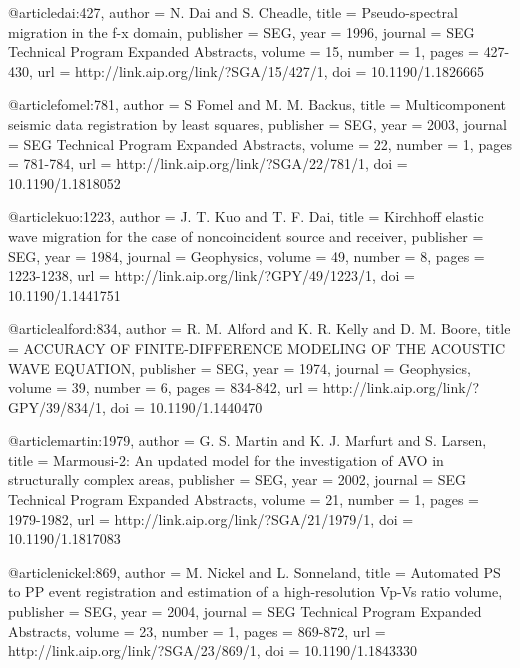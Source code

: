 @article{dai:427,
  author =	 {N. Dai and S. Cheadle},
  title =	 {Pseudo-spectral migration in the f-x domain},
  publisher =	 {SEG},
  year =	 1996,
  journal =	 {SEG Technical Program Expanded Abstracts},
  volume =	 15,
  number =	 1,
  pages =	 {427-430},
  url =		 {http://link.aip.org/link/?SGA/15/427/1},
  doi =		 {10.1190/1.1826665}
}

@article{fomel:781,
  author =	 {S Fomel and M. M. Backus},
  title =	 {Multicomponent seismic data registration by least
                  squares},
  publisher =	 {SEG},
  year =	 2003,
  journal =	 {SEG Technical Program Expanded Abstracts},
  volume =	 22,
  number =	 1,
  pages =	 {781-784},
  url =		 {http://link.aip.org/link/?SGA/22/781/1},
  doi =		 {10.1190/1.1818052}
}

@article{kuo:1223,
  author =	 {J. T. Kuo and T. F. Dai},
  title =	 {Kirchhoff elastic wave migration for the case of
                  noncoincident source and receiver},
  publisher =	 {SEG},
  year =	 1984,
  journal =	 {Geophysics},
  volume =	 49,
  number =	 8,
  pages =	 {1223-1238},
  url =		 {http://link.aip.org/link/?GPY/49/1223/1},
  doi =		 {10.1190/1.1441751}
}

@article{alford:834,
  author =	 {R. M. Alford and K. R. Kelly and D. M. Boore},
  title =	 {ACCURACY OF FINITE-DIFFERENCE MODELING OF THE
                  ACOUSTIC WAVE EQUATION},
  publisher =	 {SEG},
  year =	 1974,
  journal =	 {Geophysics},
  volume =	 39,
  number =	 6,
  pages =	 {834-842},
  url =		 {http://link.aip.org/link/?GPY/39/834/1},
  doi =		 {10.1190/1.1440470}
}

@article{martin:1979,
  author =	 {G. S. Martin and K. J. Marfurt and S. Larsen},
  title =	 {Marmousi-2: An updated model for the investigation
                  of AVO in structurally complex areas},
  publisher =	 {SEG},
  year =	 2002,
  journal =	 {SEG Technical Program Expanded Abstracts},
  volume =	 21,
  number =	 1,
  pages =	 {1979-1982},
  url =		 {http://link.aip.org/link/?SGA/21/1979/1},
  doi =		 {10.1190/1.1817083}
}

@article{nickel:869,
  author =	 {M. Nickel and L. Sonneland},
  title =	 {Automated {PS} to {PP} event registration and
                  estimation of a high-resolution {V}p-{V}s ratio
                  volume},
  publisher =	 {SEG},
  year =	 2004,
  journal =	 {SEG Technical Program Expanded Abstracts},
  volume =	 23,
  number =	 1,
  pages =	 {869-872},
  url =		 {http://link.aip.org/link/?SGA/23/869/1},
  doi =		 {10.1190/1.1843330}
}

